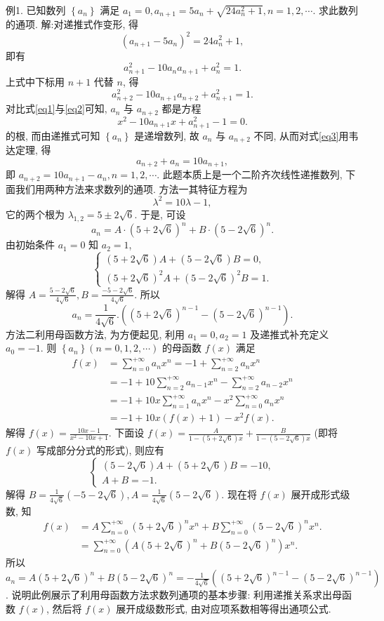 例1. 已知数列 $\left\{a_n\right\}$ 满足 $a_1=0, a_{n+1}=5 a_n+\sqrt{24 a_n^2+1}, n=1,2, \cdots$. 求此数列的通项.
解:对递推式作变形, 得
$$
\left(a_{n+1}-5 a_n\right)^2=24 a_n^2+1,
$$
即有
$$
a_{n+1}^2-10 a_n a_{n+1}+a_n^2=1 . \label{eq1}
$$
上式中下标用 $n+1$ 代替 $n$, 得
$$
a_{n+2}^2-10 a_{n+1} a_{n+2}+a_{n+1}^2=1 . \label{eq2}
$$
对比式\ref{eq1}与\ref{eq2}可知, $a_n$ 与 $a_{n+2}$ 都是方程
$$
x^2-10 a_{n+1} x+a_{n+1}^2-1=0 . \label{eq3}
$$
的根, 而由递推式可知 $\left\{a_n\right\}$ 是递增数列, 故 $a_n$ 与 $a_{n+2}$ 不同, 从而对式\ref{eq3}用韦达定理, 得
$$
a_{n+2}+a_n=10 a_{n+1},
$$
即 $a_{n+2}=10 a_{n+1}-a_n, n=1,2, \cdots$.
此题本质上是一个二阶齐次线性递推数列, 下面我们用两种方法来求数列的通项.
方法一其特征方程为
$$
\lambda^2=10 \lambda-1,
$$
它的两个根为 $\lambda_{1,2}=5 \pm 2 \sqrt{6}$. 于是, 可设
$$
a_n=A \cdot(5+2 \sqrt{6})^n+B \cdot(5-2 \sqrt{6})^n .
$$
由初始条件 $a_1=0$ 知 $a_2=1$,
$$
\left\{\begin{array}{l}
(5+2 \sqrt{6}) A+(5-2 \sqrt{6}) B=0, \\
(5+2 \sqrt{6})^2 A+(5-2 \sqrt{6})^2 B=1 .
\end{array}\right.
$$
解得 $A=\frac{5-2 \sqrt{6}}{4 \sqrt{6}}, B=\frac{-5-2 \sqrt{6}}{4 \sqrt{6}}$. 所以
$$
a_n=\frac{1}{4 \sqrt{6}} .\left((5+2 \sqrt{6})^{n-1}-(5-2 \sqrt{6})^{n-1}\right) .
$$
方法二利用母函数方法, 为方便起见, 利用 $a_1=0, a_2=1$ 及递推式补充定义 $a_0=-1$. 则 $\left\{a_n\right\}(n=0,1,2, \cdots)$ 的母函数 $f(x)$ 满足
$$
\begin{aligned}
f(x) & =\sum_{n=0}^{+\infty} a_n x^n=-1+\sum_{n=2}^{+\infty} a_n x^n \\
& =-1+10 \sum_{n=2}^{+\infty} a_{n-1} x^n-\sum_{n=2}^{+\infty} a_{n-2} x^n \\
& =-1+10 x \sum_{n=1}^{+\infty} a_n x^n-x^2 \sum_{n=0}^{+\infty} a_n x^n \\
& =-1+10 x(f(x)+1)-x^2 f(x) .
\end{aligned}
$$
解得 $f(x)=\frac{10 x-1}{x^2-10 x+1}$.
下面设 $f(x)=\frac{A}{1-(5+2 \sqrt{6}) x}+\frac{B}{1-(5-2 \sqrt{6}) x}$ (即将 $f(x)$ 写成部分分式的形式), 则应有
$$
\left\{\begin{array}{l}
(5-2 \sqrt{6}) A+(5+2 \sqrt{6}) B=-10, \\
A+B=-1 .
\end{array}\right.
$$
解得 $B=\frac{1}{4 \sqrt{6}}(-5-2 \sqrt{6}), A=\frac{1}{4 \sqrt{6}}(5-2 \sqrt{6})$.
现在将 $f(x)$ 展开成形式级数, 知
$$
\begin{aligned}
f(x) & =A \sum_{n=0}^{+\infty}(5+2 \sqrt{6})^n x^n+B \sum_{n=0}^{+\infty}(5-2 \sqrt{6})^n x^n . \\
& =\sum_{n=0}^{+\infty}\left(A(5+2 \sqrt{6})^n+B(5-2 \sqrt{6})^n\right) x^n .
\end{aligned}
$$
所以 $a_n=A(5+2 \sqrt{6})^n+B(5-2 \sqrt{6})^n=-\frac{1}{4 \sqrt{6}}\left((5+2 \sqrt{6})^{n-1}-(5-2 \sqrt{6})^{n-1}\right)$.
说明此例展示了利用母函数方法求数列通项的基本步骤: 利用递推关系求出母函数 $f(x)$, 然后将 $f(x)$ 展开成级数形式, 由对应项系数相等得出通项公式.



